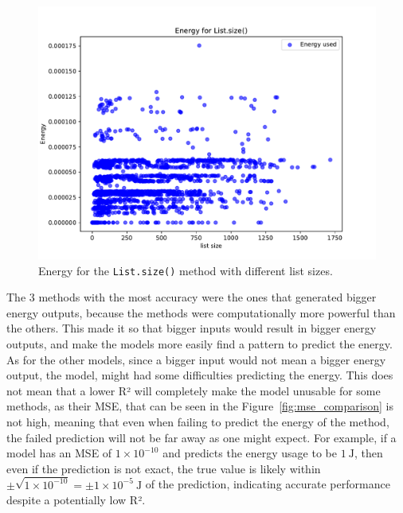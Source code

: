 \begin{figure}[htbp]
  \centering
  \includegraphics[width = .8 \textwidth]{figures/size_energy.pdf}
  \caption{Energy for the \texttt{List.size()} method with different list sizes.}
  \label{fig:size_energy}
\end{figure}

The 3 methods with the most accuracy were the ones that generated bigger energy outputs, because the methods were computationally more powerful than the others. This made it so that bigger inputs would result in bigger energy outputs, and make the models more easily find a pattern to predict the energy. As for the other models, since a bigger input would not mean a bigger energy output, the model, might had some difficulties predicting the energy. This does not mean that a lower R² will completely make the model unusable for some methods, as their MSE, that can be seen in the Figure~\ref{fig:mse_comparison} is not high, meaning that even when failing to predict the energy of the method, the failed prediction will not be far away as one might expect. For example, if a model has an MSE of $1 \times 10^{-10}$ and predicts the energy usage to be $1~\mathrm{J}$, then even if the prediction is not exact, the true value is likely within $\pm \sqrt{1 \times 10^{-10}} = \pm 1 \times 10^{-5}~\mathrm{J}$ of the prediction, indicating accurate performance despite a potentially low R². 

